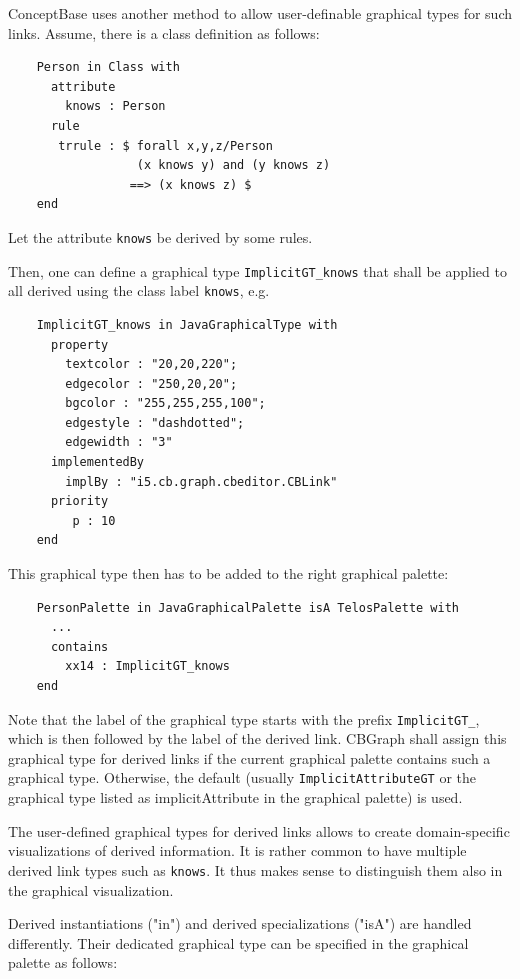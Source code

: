 ConceptBase uses another method to allow user-definable graphical types for such links.
Assume, there is a class definition as follows:

{\small
\begin{verbatim}
    Person in Class with  
      attribute
        knows : Person
      rule
       trrule : $ forall x,y,z/Person
                  (x knows y) and (y knows z)
                 ==> (x knows z) $
    end
\end{verbatim}
}

Let the attribute {\tt knows} be derived by some rules. 

Then, one can define a graphical type {\tt ImplicitGT\_knows} that shall be applied to
all derived using the class label {\tt knows}, e.g.

{\small
\begin{verbatim}
    ImplicitGT_knows in JavaGraphicalType with  
      property
        textcolor : "20,20,220";
        edgecolor : "250,20,20";
        bgcolor : "255,255,255,100";
        edgestyle : "dashdotted";
        edgewidth : "3"
      implementedBy
        implBy : "i5.cb.graph.cbeditor.CBLink"
      priority
         p : 10
    end 
\end{verbatim}
}


This graphical type then has to be added to the right graphical palette:

{\small
\begin{verbatim}
    PersonPalette in JavaGraphicalPalette isA TelosPalette with  
      ...
      contains
        xx14 : ImplicitGT_knows
    end
\end{verbatim}
}


Note that the label of the graphical type starts with the prefix {\tt ImplicitGT\_}, which is then followed
by the label of the derived link.
CBGraph shall assign this graphical type for derived links if the current graphical palette contains
such a graphical type.
Otherwise, the default (usually {\tt ImplicitAttributeGT} or the graphical type listed as implicitAttribute in the
graphical palette) is used.

The user-defined graphical types for derived links allows to create domain-specific visualizations of derived
information. It is rather common to have multiple derived link types such as {\tt knows}. It thus makes sense
to distinguish them also in the graphical visualization.

Derived instantiations ("in") and derived specializations ("isA") are handled differently. Their dedicated graphical type
can be specified in the graphical palette as follows:

